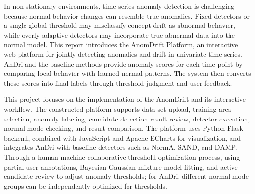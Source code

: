 
In non-stationary environments, time series anomaly detection is challenging because normal behavior changes can resemble true anomalies. Fixed detectors or a single global threshold may misclassify concept drift as abnormal behavior, while overly adaptive detectors may incorporate true abnormal data into the normal model. This report introduces the AnomDrift Platform, an interactive web platform for jointly detecting anomalies and drift in univariate time series. AnDri and the baseline methods provide anomaly scores for each time point by comparing local behavior with learned normal patterns. The system then converts these scores into final labels through threshold judgment and user feedback.



This project focuses on the implementation of the AnomDrift and its interactive workflow. The constructed platform supports data set upload, training area selection, anomaly labeling, candidate detection result review, detector execution, normal mode checking, and result comparison. The platform uses Python Flask backend, combined with JavaScript and Apache ECharts for visualization, and integrates AnDri with baseline detectors such as NormA, SAND, and DAMP.   
Through a human-machine collaborative threshold optimization process, using partial user annotations, Bayesian Gaussian mixture model fitting, and active candidate review to adjust anomaly thresholds; for AnDri, different normal mode groups can be independently optimized for thresholds.

